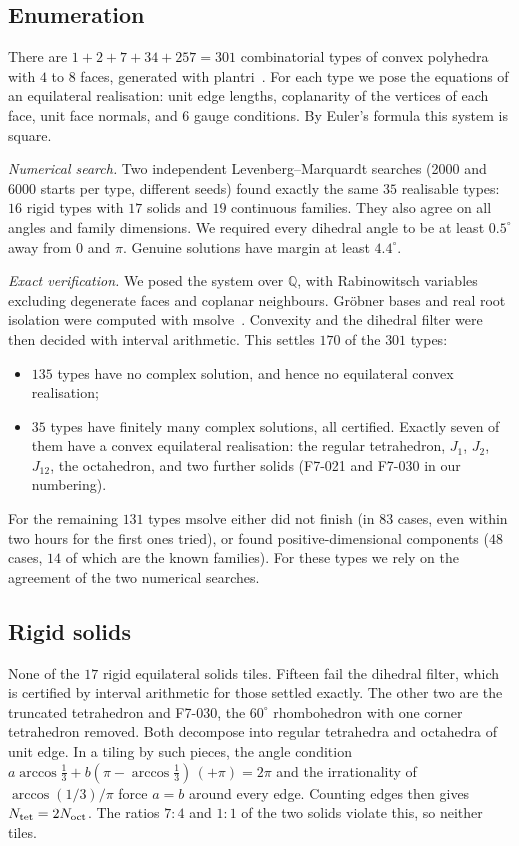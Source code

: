 \documentclass[11pt]{amsart}
\theoremstyle{definition}
\newcommand{\Q}{\mathbb{Q}}
\begin{document}
\subsection{Enumeration}
There are $1+2+7+34+257=301$ combinatorial types of convex polyhedra with $4$ to $8$ faces, generated with
plantri~\cite{plantri}. For each type we pose the equations of an equilateral realisation: unit edge lengths,
coplanarity of the vertices of each face, unit face normals, and $6$ gauge conditions. By Euler's formula this
system is square.

\emph{Numerical search.} Two independent Levenberg--Marquardt searches (2000 and 6000 starts per type, different
seeds) found exactly the same $35$ realisable types: $16$ rigid types with $17$ solids and $19$ continuous families.
They also agree on all angles and family dimensions. We required every dihedral angle to be at least $0.5^\circ$ away from
$0$ and $\pi$. Genuine solutions have margin at least $4.4^\circ$.

\emph{Exact verification.} We posed the system over $\Q$, with Rabinowitsch variables excluding degenerate faces
and coplanar neighbours. Gr\"obner bases and real root isolation were computed with msolve~\cite{msolve}. Convexity
and the dihedral filter were then decided with interval arithmetic. This settles $170$ of the $301$ types:
\begin{itemize}[leftmargin=2em]
\item $135$ types have no complex solution, and hence no equilateral convex realisation;
\item $35$ types have finitely many complex solutions, all certified. Exactly seven of them have a convex
equilateral realisation: the regular tetrahedron, $J_1$, $J_2$, $J_{12}$, the octahedron, and two further solids
(F7-021 and F7-030 in our numbering).
\end{itemize}
For the remaining $131$ types msolve either did not finish (in $83$ cases, even within two hours for the first ones
tried), or found positive-dimensional components ($48$ cases, $14$ of which are the known families). For these
types we rely on the agreement of the two numerical searches.

\subsection{Rigid solids}
None of the $17$ rigid equilateral solids tiles. Fifteen fail the dihedral filter, which is certified by interval
arithmetic for those settled exactly. The other two are the truncated tetrahedron and F7-030, the $60^\circ$
rhombohedron with one corner tetrahedron removed. Both decompose into regular tetrahedra and octahedra of unit edge.
In a tiling by such pieces, the angle condition $a\arccos\frac13+b(\pi-\arccos\frac13)\,(+\pi)=2\pi$ and the
irrationality of $\arccos(1/3)/\pi$ force $a=b$ around every edge. Counting edges then gives $N_{\rm tet}=2N_{\rm oct}$.
The ratios $7:4$ and $1:1$ of the two solids violate this, so neither tiles.
\end{document}
